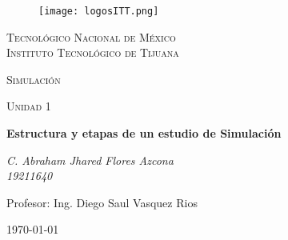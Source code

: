 \documentclass[letterpaper, 12pt]{article}
\begin{document}
    
    \begin{titlepage}
        \begin{figure}[ht]
            \centering
            \texttt{[image: logosITT.png]}
        \end{figure}
        \centering
        {\scshape\LARGE Tecnológico Nacional de México\\Instituto Tecnológico de Tijuana\par}
        \vspace{1cm}
        {\scshape\Large Simulación\par}
        \vspace{1cm}
        {\scshape\Large Unidad 1\par}
        \vspace{1.5cm}
        {\huge\bfseries Estructura y etapas de un estudio de Simulación\par}
        \vspace{2cm}
        {\Large\itshape C. Abraham Jhared Flores Azcona\\19211640\par}
        \vfill
        Profesor: Ing. Diego Saul Vasquez Rios\par
    
        \vfill

        {\large \today}
    \end{titlepage}
\end{document}
